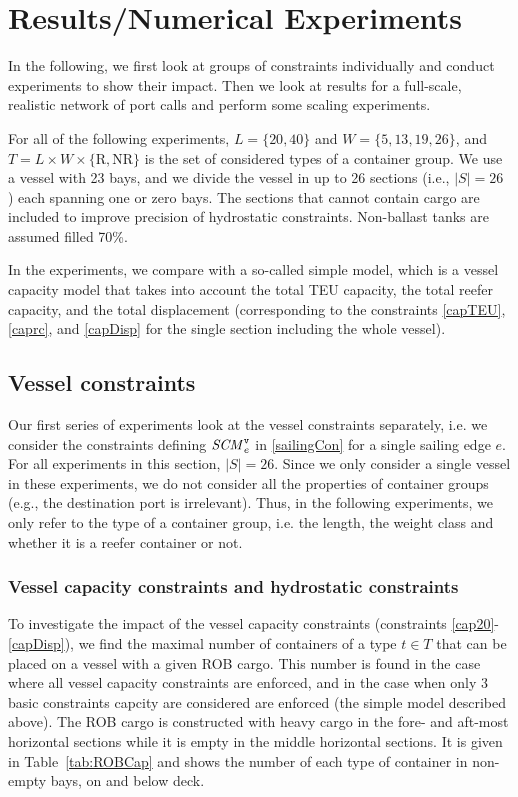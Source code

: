 \section{Results/Numerical Experiments}
In the following, we first look at groups of constraints individually and conduct experiments to show their impact. Then we look at results for a full-scale, realistic network of port calls and perform some scaling experiments. %

For all of the following experiments, $L=\{20,40\}$ and $W = \{5,13,19,26\}$, and $T=L\times W\times \{\text{R},\text{NR}\}$ is the set of considered types of a container group. We use a vessel with 23 bays, and we {divide the vessel in up to 26 sections (i.e., $|S| = 26$ )} each spanning one or zero bays. The sections that cannot contain cargo are included to improve precision of hydrostatic constraints. Non-ballast tanks are assumed filled 70\%.

In the experiments, we compare with a so-called simple model, which is a vessel capacity model that takes into account the total TEU capacity, the total reefer capacity, and the total displacement (corresponding to the constraints \eqref{capTEU}, \eqref{caprc}, and \eqref{capDisp} for the single section including the whole vessel).


\subsection{Vessel constraints} %
Our first series of experiments look at the vessel constraints separately, i.e. we consider the constraints defining $\mathit{SCM}^\texttt{v}_{e}$ in \eqref{sailingCon} for a single sailing edge $e$. 
For all experiments in this section, $|S| = 26$.
Since we only consider a single vessel in these experiments, we do not consider all the properties of container groups (e.g., the destination port is irrelevant). Thus, in the following experiments, we only refer to the type of a container group, i.e. the length, the weight class and whether it is a reefer container or not. 

\subsubsection{Vessel capacity constraints and hydrostatic constraints}
To investigate the impact of the vessel capacity constraints (constraints \eqref{cap20}-\eqref{capDisp}), we find the maximal number of containers of a type $t\in T$ that can be placed on a vessel with a given ROB cargo. This number is found in the case where all vessel capacity constraints are enforced, and in the case when only 3 basic constraints capcity are considered are enforced (the simple model described above).
The ROB cargo is constructed with heavy cargo in the fore- and aft-most horizontal sections while it is empty in the middle horizontal sections. It is given in Table~\ref{tab:ROBCap} and shows the number of each type of container in non-empty bays, on and below deck.

